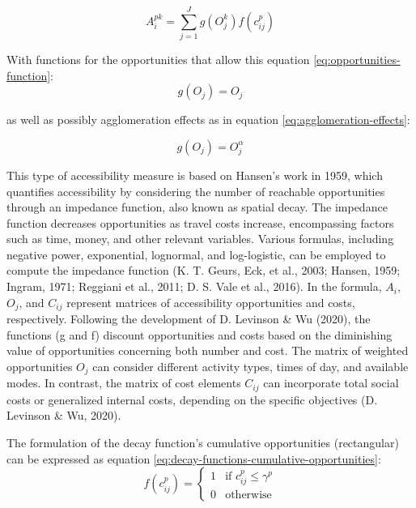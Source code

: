 \documentclass[
11pt, %
oneside, %
english, %
singlespacing, %
]{macthesis} %
\begin{document}
\begin{equation}
A^{pk}_i = \sum _{j=1} ^ {J} g(O^ k_{j}) f(c^p_{ij})
\label{eq:accessibility}
\end{equation}

With functions for the opportunities that allow this equation \eqref{eq:opportunities-function}:
\begin{equation}
g(O_j) = O_j
\label{eq:opportunities-function}
\end{equation}

\noindent as well as possibly agglomeration effects as in equation \eqref{eq:agglomeration-effects}:

\begin{equation}
g(O_j) = O^\alpha_j
\label{eq:agglomeration-effects}
\end{equation}

This type of accessibility measure is based on Hansen's work in 1959, which quantifies accessibility by considering the number of reachable opportunities through an impedance function, also known as spatial decay. The impedance function decreases opportunities as travel costs increase, encompassing factors such as time, money, and other relevant variables. Various formulas, including negative power, exponential, lognormal, and log-logistic, can be employed to compute the impedance function (K. T. Geurs, Eck, et al., 2003; Hansen, 1959; Ingram, 1971; Reggiani et al., 2011; D. S. Vale et al., 2016). In the formula, \(A_i\), \(O_j\), and \(C_{ij}\) represent matrices of accessibility opportunities and costs, respectively. Following the development of D. Levinson \& Wu (2020), the functions (g and f) discount opportunities and costs based on the diminishing value of opportunities concerning both number and cost. The matrix of weighted opportunities \(O_j\) can consider different activity types, times of day, and available modes. In contrast, the matrix of cost elements \(C_{ij}\) can incorporate total social costs or generalized internal costs, depending on the specific objectives (D. Levinson \& Wu, 2020).

The formulation of the decay function's cumulative opportunities (rectangular) can be expressed as equation \eqref{eq:decay-functions-cumulative-opportunities}:
\begin{equation}
f(c^p_{ij}) = 
\begin{cases}
  1 & \text{if } c^p_{ij} \le \gamma^p \\
  0 & \text{otherwise}
\end{cases}
\label{eq:decay-functions-cumulative-opportunities}
\end{equation}
\end{document}

